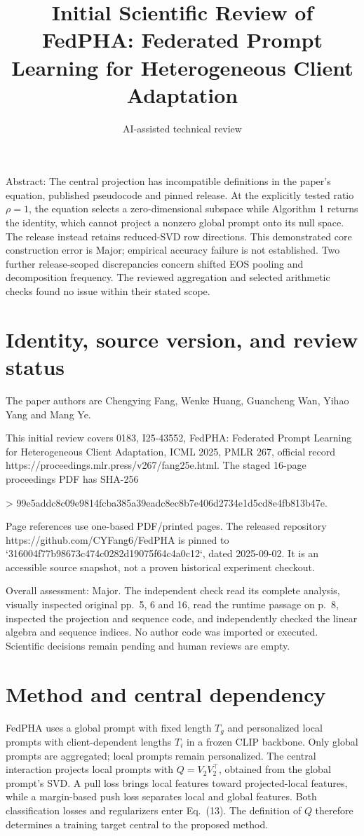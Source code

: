 \documentclass[10pt]{article}
\title{Initial Scientific Review of
FedPHA: Federated Prompt Learning for Heterogeneous Client Adaptation}
\author{AI-assisted technical review}
\date{}
\begin{document}
\maketitle
Abstract: The central projection has incompatible definitions in the paper’s equation, published pseudocode and pinned release. At the explicitly tested ratio \(\rho=1\), the equation selects a zero-dimensional subspace while Algorithm 1 returns the identity, which cannot project a nonzero global prompt onto its null space. The release instead retains reduced-SVD row directions. This demonstrated core construction error is Major; empirical accuracy failure is not established. Two further release-scoped discrepancies concern shifted EOS pooling and decomposition frequency. The reviewed aggregation and selected arithmetic checks found no issue within their stated scope.\par
\section*{Identity, source version, and review status}
The paper authors are Chengying Fang, Wenke Huang, Guancheng Wan, Yihao Yang and Mang Ye.\par
This initial review covers 0183, I25-43552, FedPHA: Federated Prompt Learning for Heterogeneous Client Adaptation, ICML 2025, PMLR 267, official record https://proceedings.mlr.press/v267/fang25e.html. The staged 16-page proceedings PDF has SHA-256\par
> 99e5addc8c09e9814fcba385a39eadc8ec8b7e406d2734e1d5cd8e4fb813b47e.\par
Page references use one-based PDF/printed pages. The released repository https://github.com/CYFang6/FedPHA is pinned to `316004f77b98673c474c0282d19075f64c4a0c12`, dated 2025-09-02. It is an accessible source snapshot, not a proven historical experiment checkout.\par
Overall assessment: Major. The independent check read its complete analysis, visually inspected original pp. 5, 6 and 16, read the runtime passage on p. 8, inspected the projection and sequence code, and independently checked the linear algebra and sequence indices. No author code was imported or executed. Scientific decisions remain pending and human reviews are empty.\par
\section*{Method and central dependency}
FedPHA uses a global prompt with fixed length \(T_g\) and personalized local prompts with client-dependent lengths \(T_i\) in a frozen CLIP backbone. Only global prompts are aggregated; local prompts remain personalized. The central interaction projects local prompts with \(Q=V_2V_2^\top\), obtained from the global prompt’s SVD. A pull loss brings local features toward projected-local features, while a margin-based push loss separates local and global features. Both classification losses and regularizers enter Eq. (13). The definition of \(Q\) therefore determines a training target central to the proposed method.\par
\end{document}
